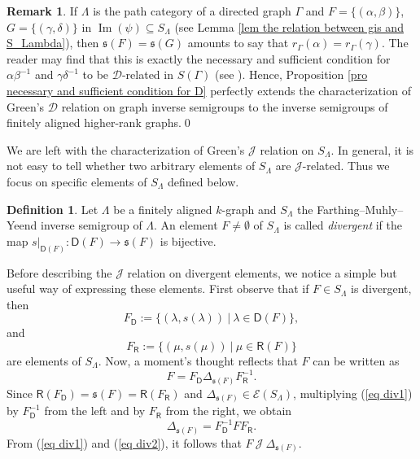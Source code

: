 \documentclass[a4paper,reqno,11pt]{amsart}
\numberwithin{equation}{section}
\theoremstyle{definition}
\newtheorem{dfn}[thm]{Definition}
\newtheorem{rmk}[thm]{Remark}
\theoremstyle{remark}
\newcommand{\image}{\operatorname{Im}}
\begin{document}
\begin{rmk}\label{rem recovering D of graph inverse semigroups}
If $\Lambda$ is the path category of a directed graph $\Gamma$ and $F=\{(\alpha,\beta)\}$, $G=\{(\gamma,\delta)\}$ in $\image(\psi)\subseteq S_\Lambda$ (see Lemma \ref{lem the relation between gis and S_Lambda}), then $\mathfrak{s}(F)=\mathfrak{s}(G)$ amounts to say that $r_\Gamma(\alpha)=r_\Gamma(\gamma)$. The reader may find that this is exactly the necessary and sufficient condition for $\alpha\beta^{-1}$ and $\gamma\delta^{-1}$ to be $\mathscr{D}$-related in $S(\Gamma)$ (see \cite[Corollary 2(5)]{Mesyan}). Hence, Proposition \ref{pro necessary and sufficient condition for D} perfectly extends the characterization of Green's $\mathscr{D}$ relation on graph inverse semigroups to the inverse semigroups of finitely aligned higher-rank graphs.\qed
\end{rmk}

We are left with the characterization of Green's $\mathscr{J}$ relation on $S_\Lambda$. In general, it is not easy to tell whether two arbitrary elements of $S_\Lambda$ are $\mathscr{J}$-related. Thus we focus on specific elements of $S_\Lambda$ defined below.
\begin{dfn}\label{def divergent set}
Let $\Lambda$ be a finitely aligned $k$-graph and $S_\Lambda$ the Farthing--Muhly--Yeend inverse semigroup of $\Lambda$. An element $F\neq \emptyset$ of $S_\Lambda$ is called \emph{divergent} if the map $s|_{\mathsf{D}(F)}:\mathsf{D}(F)\longrightarrow \mathfrak{s}(F)$ is bijective.     
\end{dfn}

Before describing the $\mathscr{J}$ relation on divergent elements, we notice a simple but useful way of expressing these elements. First observe that if $F\in S_\Lambda$ is divergent, then \[F_\mathsf{D}:=\{(\lambda,s(\lambda))~|~\lambda\in \mathsf{D}(F)\},\] and \[F_\mathsf{R}:=\{(\mu,s(\mu))~|~\mu\in \mathsf{R}(F)\}\] are elements of $S_\Lambda$. Now, a moment's thought reflects that $F$ can be written as 
\begin{equation}\label{eq div1}
F=F_{\mathsf{D}}\Delta_{\mathfrak{s}(F)}F_{\mathsf{R}}^{-1}.    
\end{equation} 
Since $\mathsf{R}(F_\mathsf{D})=\mathfrak{s}(F)=\mathsf{R}(F_\mathsf{R})$ and $\Delta_{\mathfrak{s}(F)}\in \mathcal{E}(S_\Lambda)$, multiplying (\ref{eq div1}) by $F_\mathsf{D}^{-1}$ from the left and by $F_\mathsf{R}$ from the right, we obtain 
\begin{equation}\label{eq div2}
\Delta_{\mathfrak{s}(F)}=F_{\mathsf{D}}^{-1}F F_\mathsf{R}.
\end{equation}
From (\ref{eq div1}) and (\ref{eq div2}), it follows that $F~\mathscr{J}~\Delta_{\mathfrak{s}(F)}$. 
 
\end{document}
